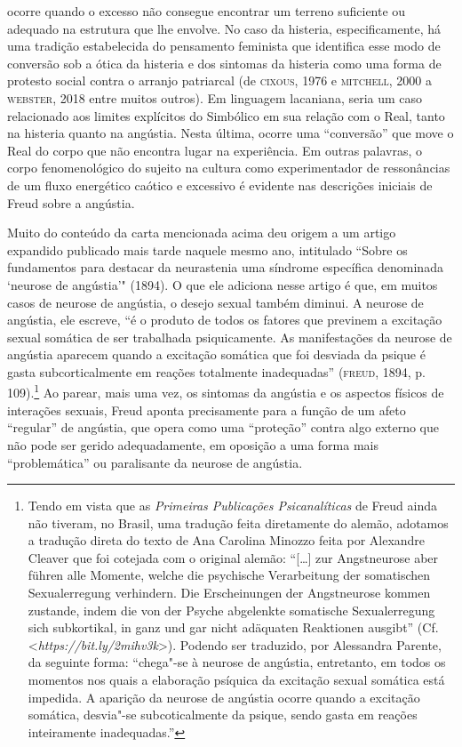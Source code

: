 ocorre quando o excesso não consegue encontrar um terreno suficiente ou
adequado na estrutura que lhe envolve. No caso da histeria,
especificamente, há uma tradição estabelecida do pensamento feminista
que identifica esse modo de conversão sob a ótica da histeria e dos
sintomas da histeria como uma forma de protesto social contra o arranjo
patriarcal (de \textsc{cixous}, 1976 e \textsc{mitchell}, 2000 a \textsc{webster}, 2018 entre
muitos outros). Em linguagem lacaniana, seria um caso relacionado aos
limites explícitos do Simbólico em sua relação com o Real, tanto na
histeria quanto na angústia. Nesta última, ocorre uma ``conversão'' que
move o Real do corpo que não encontra lugar na experiência. Em outras
palavras, o corpo fenomenológico do sujeito na cultura como
experimentador de ressonâncias de um fluxo energético caótico e
excessivo é evidente nas descrições iniciais de Freud sobre a angústia.

Muito do conteúdo da carta mencionada acima deu origem a um artigo
expandido publicado mais tarde naquele mesmo ano, intitulado ``Sobre os
fundamentos para destacar da neurastenia uma síndrome específica
denominada `neurose de angústia'" (1894). O que ele adiciona nesse
artigo é que, em muitos casos de neurose de angústia, o desejo sexual
também diminui. A neurose de angústia, ele escreve, ``é o produto de
todos os fatores que previnem a excitação sexual somática de ser
trabalhada psiquicamente. As manifestações da neurose de angústia
aparecem quando a excitação somática que foi desviada da psique é gasta
subcorticalmente em reações totalmente inadequadas'' (\textsc{freud}, 1894, p.
109).\footnote{Tendo em vista que as \emph{Primeiras Publicações
  Psicanalíticas} de Freud ainda não tiveram, no Brasil, uma tradução
  feita diretamente do alemão, adotamos a tradução direta do texto de
  Ana Carolina Minozzo feita por Alexandre Cleaver que foi cotejada com
  o original alemão: ``{[}\ldots{}{]} zur Angstneurose aber führen alle
  Momente, welche die psychische Verarbeitung der somatischen
  Sexualerregung verhindern. Die Erscheinungen der Angstneurose kommen
  zustande, indem die von der Psyche abgelenkte somatische
  Sexualerregung sich subkortikal, in ganz und gar nicht adäquaten
  Reaktionen ausgibt'' (Cf. \textless{}\emph{https://bit.ly/2mihv3k}\textgreater{}).
  Podendo ser traduzido, por Alessandra Parente, da seguinte forma:
  ``chega"-se à neurose de angústia, entretanto, em todos os momentos nos
  quais a elaboração psíquica da excitação sexual somática está
  impedida. A aparição da neurose de angústia ocorre quando a excitação
  somática, desvia"-se subcoticalmente da psique, sendo gasta em reações
  inteiramente inadequadas.''} Ao parear, mais uma vez, os sintomas da
angústia e os aspectos físicos de interações sexuais, Freud aponta
precisamente para a função de um afeto ``regular'' de angústia, que
opera como uma ``proteção'' contra algo externo que não pode ser gerido
adequadamente, em oposição a uma forma mais ``problemática'' ou
paralisante da neurose de angústia.


